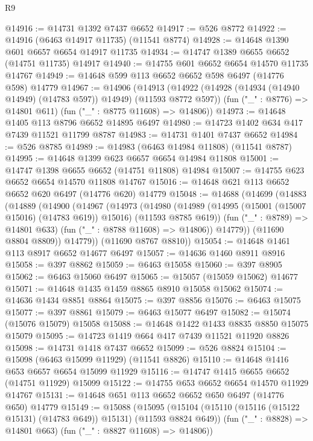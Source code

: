 \begin{lexlean}{R9}
\begin{coremodule}
@14916 := @14731 @1392 @7437 @6652
@14917 := @526 @8772
@14922 := @14916 (@6463 @14917 @11735) (@11541 @8774)
@14928 := @14648 @1390 @601 @6657 @6654 @14917 @11735
@14934 := @14747 @1389 @6655 @6652 (@14751 @11735) @14917
@14940 := @14755 @601 @6652 @6654 @14570 @11735 @14767
@14949 := @14648 @599 @113 @6652 @6652 @598 @6497 (@14776 @598) @14779
@14967 := @14906
    (@14913
      (@14922 (@14928 (@14934 (@14940 @14949) (@14783 @597)) @14949) (@11593 @8772 @597))
      (fun ("_" : @8776) => @14801 @611)
      (fun ("_" : @8775 @11608) => @14806))
@14973 := @14648 @1405 @113 @8796 @6652 @14895 @6497
@14980 := @14723 @1402 @634 @417 @7439 @11521 @11799 @8787
@14983 := @14731 @1401 @7437 @6652
@14984 := @526 @8785
@14989 := @14983 (@6463 @14984 @11808) (@11541 @8787)
@14995 := @14648 @1399 @623 @6657 @6654 @14984 @11808
@15001 := @14747 @1398 @6655 @6652 (@14751 @11808) @14984
@15007 := @14755 @623 @6652 @6654 @14570 @11808 @14767
@15016 := @14648 @621 @113 @6652 @6652 @620 @6497 (@14776 @620) @14779
@15048 := @14688
    (@14699
      (@14883
        (@14889
          (@14900
            (@14967
              (@14973
                (@14980
                  (@14989
                    (@14995 (@15001 (@15007 @15016) (@14783 @619)) @15016)
                    (@11593 @8785 @619))
                  (fun ("_" : @8789) => @14801 @633)
                  (fun ("_" : @8788 @11608) => @14806))
                @14779))
            (@11690 @8804 @8809))
          @14779))
      (@11690 @8767 @8810))
@15054 := @14648 @1461 @113 @8917 @6652 @14677 @6497
@15057 := @14636 @1460 @8911 @8916
@15058 := @397 @8862
@15059 := @6463 @15058
@15060 := @397 @8905
@15062 := @6463 @15060 @6497
@15065 := @15057 (@15059 @15062) @14677
@15071 := @14648 @1435 @1459 @8865 @8910 @15058 @15062
@15074 := @14636 @1434 @8851 @8864
@15075 := @397 @8856
@15076 := @6463 @15075
@15077 := @397 @8861
@15079 := @6463 @15077 @6497
@15082 := @15074 (@15076 @15079) @15058
@15088 := @14648 @1422 @1433 @8835 @8850 @15075 @15079
@15095 := @14723 @1419 @664 @417 @7439 @11521 @11920 @8826
@15098 := @14731 @1418 @7437 @6652
@15099 := @526 @8824
@15104 := @15098 (@6463 @15099 @11929) (@11541 @8826)
@15110 := @14648 @1416 @653 @6657 @6654 @15099 @11929
@15116 := @14747 @1415 @6655 @6652 (@14751 @11929) @15099
@15122 := @14755 @653 @6652 @6654 @14570 @11929 @14767
@15131 := @14648 @651 @113 @6652 @6652 @650 @6497 (@14776 @650) @14779
@15149 := @15088
    (@15095
      (@15104 (@15110 (@15116 (@15122 @15131) (@14783 @649)) @15131) (@11593 @8824 @649))
      (fun ("_" : @8828) => @14801 @663)
      (fun ("_" : @8827 @11608) => @14806))

\end{coremodule}
\end{lexlean}
